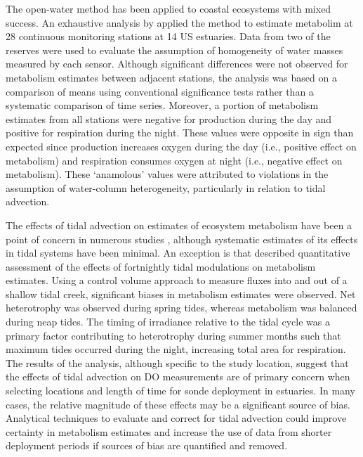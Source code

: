 \documentclass[letterpaper,12pt,oneside]{article}\usepackage[]{graphicx}\usepackage[]{color}
\begin{document}
The open-water method has been applied to coastal ecosystems with mixed success.  An exhaustive analysis by \citet{Caffrey03} applied the method to estimate metabolim at 28 continuous monitoring stations at 14 US estuaries.  Data from two of the reserves were used to evaluate the assumption of homogeneity of water masses measured by each sensor.  Although significant differences were not observed for metabolism estimates between adjacent stations, the analysis was based on a comparison of means using conventional significance tests rather than a systematic comparison of time series.  Moreover, a portion of metabolism estimates from all stations were negative for production during the day and positive for respiration during the night.  These values were opposite in sign than expected since production increases oxygen during the day (i.e., positive effect on metabolism) and respiration consumes oxygen at night (i.e., negative effect on metabolism).  These `anamolous' values were attributed to violations in the assumption of water-column heterogeneity, particularly in relation to tidal advection. 

The effects of tidal advection on estimates of ecosystem metabolism have been a point of concern in numerous studies \citep{Monbet92,Ziegler98,Caffrey03,Collins13,Howarth14}, although systematic estimates of its effects in tidal systems have been minimal.  An exception is \citet{Nidzieko14} that described quantitative assessment of the effects of fortnightly tidal modulations on metabolism estimates.  Using a control volume approach to measure fluxes into and out of a shallow tidal creek, significant biases in metabolism estimates were observed.  Net heterotrophy was observed during spring tides, whereas metabolism was balanced during neap tides.  The timing of irradiance relative to the tidal cycle was a primary factor contributing to heterotrophy during summer months such that maximum tides occurred during the night, increasing total area for respiration.  The results of the analysis, although specific to the study location, suggest that the effects of tidal advection on \ac{DO} measurements are of primary concern when selecting locations and length of time for sonde deployment in estuaries.  In many cases, the relative magnitude of these effects may be a significant source of bias.  Analytical techniques to evaluate and correct for tidal advection could improve certainty in metabolism estimates and increase the use of data from shorter deployment periods if sources of bias are quantified and removed.       
\end{document}
